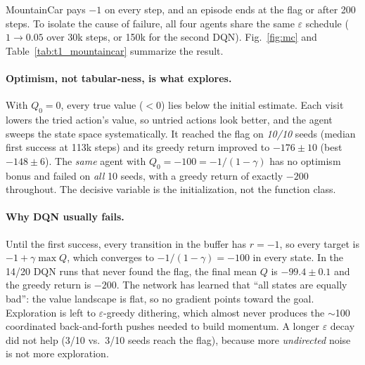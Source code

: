 
MountainCar pays $-1$ on every step, and an episode ends at the flag or after 200 steps. To isolate the
cause of failure, all four agents share the same $\varepsilon$ schedule ($1\!\to\!0.05$ over 30k steps,
or 150k for the second DQN). Fig.~\ref{fig:mc} and Table~\ref{tab:t1_mountaincar} summarize the result.

\paragraph{Optimism, not tabular-ness, is what explores.} With $Q_0=0$, every true value ($<0$) lies
below the initial estimate. Each visit lowers the tried action's value, so untried actions look better,
and the agent sweeps the state space systematically. It reached the flag on \emph{10/10} seeds (median
first success at 113k steps) and its greedy return improved to $-176\pm10$ (best $-148\pm6$). The
\emph{same} agent with $Q_0=-100=-1/(1-\gamma)$ has no optimism bonus and failed on \emph{all} 10 seeds,
with a greedy return of exactly $-200$ throughout. The decisive variable is the initialization, not the
function class.

\paragraph{Why DQN usually fails.} Until the first success, every transition in the buffer has $r=-1$,
so every target is $-1+\gamma\max Q$, which converges to $-1/(1-\gamma)=-100$ in every state. In the
14/20 DQN runs that never found the flag, the final mean $Q$ is $-99.4\pm0.1$ and the greedy return is
$-200$. The network has learned that ``all states are equally bad'': the value landscape is flat, so no
gradient points toward the goal. Exploration is left to $\varepsilon$-greedy dithering, which almost never
produces the $\sim$100 coordinated back-and-forth pushes needed to build momentum. A longer
$\varepsilon$ decay did not help (3/10 vs.\ 3/10 seeds reach the flag), because more \emph{undirected}
noise is not more exploration.


